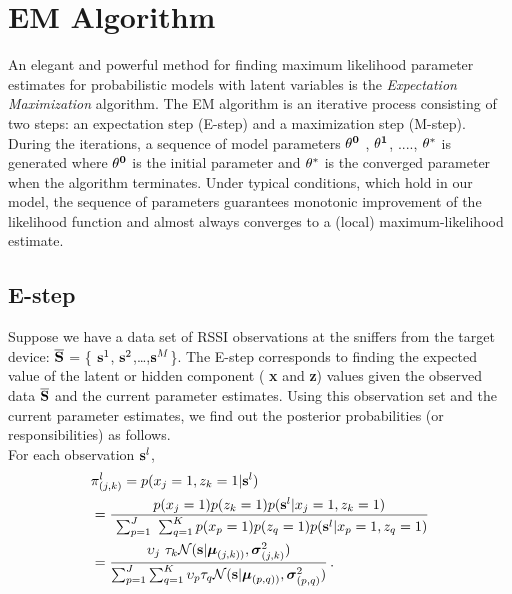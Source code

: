 \section{EM Algorithm}
\label{sec:emalgorithm}

An elegant and powerful method for finding maximum likelihood parameter estimates
for probabilistic models with latent variables is the \emph{Expectation Maximization} 
	algorithm. The EM algorithm is an iterative process consisting of two
	steps: an expectation step (E-step) and a maximization step (M-step). During the iterations, a sequence of model parameters ${\bf \theta^{0}}$
, ${\bf \theta^{1}}$, ...., ${\bf \theta^{*}}$ is generated where ${\bf \theta^{0}}$ is the initial parameter and ${\bf \theta^{*}}$ is the converged parameter when the algorithm terminates. Under typical conditions, which hold in our model, the sequence of parameters guarantees monotonic improvement of the likelihood function and almost always converges to a (local) maximum-likelihood estimate.

\subsection{E-step}
\label{subsec:estep}

Suppose we have a data set of RSSI observations at
the sniffers from the target device: ${\bf \overline{S}}$ = \{
${\bf {s}}^{1}$, ${\bf {s}}^{2}$,\ldots,${\bf {s}}^{M}$\}. The E-step
corresponds to finding the expected value of the latent or hidden component ({\bf
		x} and {\bf z}) values given the observed data  ${\bf \overline{S}}$ and the current parameter estimates.
Using this observation set and the current parameter estimates, we find out the posterior probabilities (or responsibilities) as follows. \\

\noindent For each observation ${\bf {s}}^{l}$,
\begin{align}
& \pi_{(j,k)}^{l}  = p({x_{j}} = 1, {z_{k}} = 1 | {\bf{s}}^{l}) \\ 
& = \frac { p({x_{j}} = 1)p({z_{k}} = 1)p( {\bf {s}}^{l} | {x_{j}} = 1, {z_{k}} = 1)} {\ \sum_{p=1}^J \ \sum_{q=1}^{K} p({x_{p}} = 1) p({z_{q}} = 1) p( {\bf {s}}^{l} | {x_{p}} = 1, {z_{q}} = 1)} \nonumber \\ 
& = \frac { \upsilon_{j} \ \tau_{k} \mathcal{N}(\mathbf{s} |  \boldsymbol\mu_{(j,k))},\boldsymbol\sigma_{(j,k)}^2)} {\sum_{p=1}^J \sum_{q=1}^K \upsilon_{p} \tau_{q} \mathcal{N}(\mathbf{s} |  \boldsymbol\mu_{(p,q))},\boldsymbol\sigma_{(p,q)}^2) } \, . 
\end{align}

